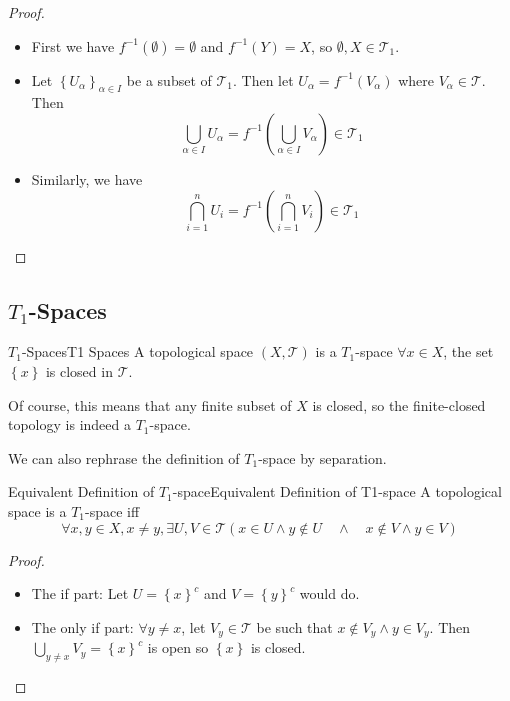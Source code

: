 \documentclass[../main.tex]{subfiles}
\begin{document}
\begin{proof}
\begin{itemize}
\item First we have $f^{-1}(\emptyset) = \emptyset$ and $f^{-1}(Y) = X$, so $\emptyset, X \in \mathcal{T}_1$.
\item Let $\left\{ U_{\alpha} \right\}_{\alpha \in I}$ be a subset of $\mathcal{T}_1$. Then let $U_{\alpha} = f^{-1}\left(V_{\alpha}\right)$ where $V_{\alpha} \in \mathcal{T}$. Then
	\begin{equation*}
	\bigcup_{\alpha\in I} U_{\alpha} = f^{-1}\left(\bigcup_{\alpha\in I} V_{\alpha}\right) \in \mathcal{T}_1
	\end{equation*}
\item Similarly, we have
	\begin{equation*}
	\bigcap_{i=1}^{n} U_i = f^{-1}\left(\bigcap_{i=1}^{n} V_i\right)\in \mathcal{T}_1
	\end{equation*}
\end{itemize}
\end{proof}

\subsection{$T_1$-Spaces}
\begin{definition}{$T_1$-Spaces}{T1 Spaces}
A topological space $(X,\mathcal{T})$ is a $T_1$-space $\forall x\in X$, the set $\left\{ x \right\}$ is closed in $\mathcal{T}$.
\end{definition}

Of course, this means that any finite subset of $X$ is closed, so the finite-closed topology is indeed a $T_1$-space.

We can also rephrase the definition of $T_1$-space by separation.
\begin{theorem}{Equivalent Definition of $T_1$-space}{Equivalent Definition of T1-space}
A topological space is a $T_1$-space iff
\begin{equation}
\forall x,y\in X, x\neq y, \exists U,V\in \mathcal{T} (x\in U \land y\notin U \quad \land \quad x\notin V\land y\in V)
\end{equation}
\end{theorem}
\begin{proof}
\begin{itemize}
\item The if part: Let $U = \left\{ x \right\}^{c}$ and $V = \left\{ y \right\}^{c}$ would do.
\item The only if part: $\forall y\neq x$, let $V_y\in \mathcal{T}$ be such that $x\notin V_y \land y\in V_y$. Then $\bigcup_{y\neq x} V_y = \left\{ x \right\}^{c}$ is open so $\left\{ x \right\}$ is closed.
\end{itemize}
\end{proof}
\end{document}

